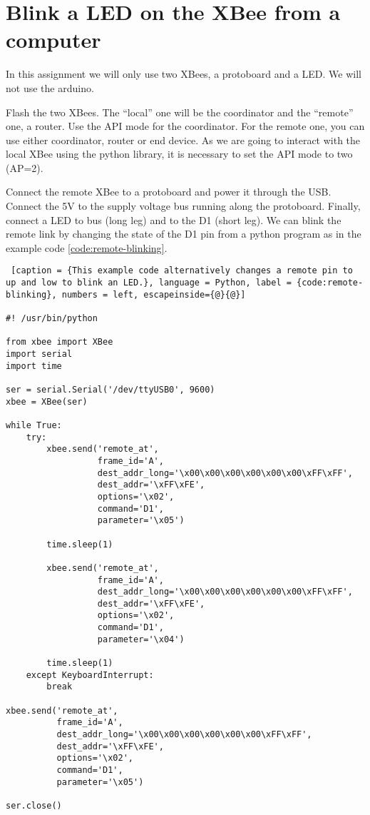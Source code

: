 \chapter{Blink a LED on the XBee from a computer}

In this assignment we will only use two XBees, a protoboard and a LED.
We will not use the arduino.

Flash the two XBees.
The ``local'' one will be the coordinator and the ``remote'' one, a router.
Use the API mode for the coordinator.
For the remote one, you can use either coordinator, router or end device.
As we are going to interact with the local XBee using the python library, it is necessary to set the API mode to two (AP=2).

Connect the remote XBee to a protoboard and power it through the USB.
Connect the 5V to the supply voltage bus running along the protoboard.
Finally, connect a LED to bus (long leg) and to the D1 (short leg).
We can blink the remote link by changing the state of the D1 pin from a python program as in the example code \ref{code:remote-blinking}.

\begin{lstlisting} [caption = {This example code alternatively changes a remote pin to up and low to blink an LED.}, language = Python, label = {code:remote-blinking}, numbers = left, escapeinside={@}{@}]

#! /usr/bin/python

from xbee import XBee
import serial
import time

ser = serial.Serial('/dev/ttyUSB0', 9600)
xbee = XBee(ser)

while True:
    try:
        xbee.send('remote_at', 
                  frame_id='A',
                  dest_addr_long='\x00\x00\x00\x00\x00\x00\xFF\xFF',
                  dest_addr='\xFF\xFE',
                  options='\x02',
                  command='D1',
                  parameter='\x05')
          
        time.sleep(1)
        
        xbee.send('remote_at', 
                  frame_id='A',
                  dest_addr_long='\x00\x00\x00\x00\x00\x00\xFF\xFF',
                  dest_addr='\xFF\xFE',
                  options='\x02',
                  command='D1',
                  parameter='\x04')
          
        time.sleep(1)
    except KeyboardInterrupt:
        break

xbee.send('remote_at', 
          frame_id='A',
          dest_addr_long='\x00\x00\x00\x00\x00\x00\xFF\xFF',
          dest_addr='\xFF\xFE',
          options='\x02',
          command='D1',
          parameter='\x05')

ser.close()


\end{lstlisting}


